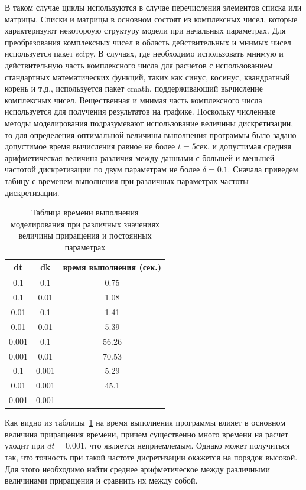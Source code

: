 В таком случае циклы используются в случае перечисления элементов списка или матрицы.
Списки и матрицы в основном состоят из комплексных чисел, которые характеризуют некотороую структуру
модели при начальных параметрах.
Для преобразования комплексных чисел в область действительных и мнимых чисел используется пакет scipy.
В случаях, где необходимо использовать мнимую и действительную часть комплексного числа для расчетов
с использованием стандартных математических функций, таких как синус, косинус, квандратный корень и т.д.,
используется пакет cmath, поддерживающий вычисление комплексных чисел.
Вещественная и мнимая часть комплексного числа используется для получения результатов на графике.
Поскольку численные методы моделирования подразумевают использование величины дискретизации, то для определения
оптимальной величины выполнения программы было задано допустимое время вычисления равное не более
$t = 5$сек. и допустимая средняя арифметическая величина различия между данными с большей и меньшей
частотой дискретизации по двум параметрам не более $\delta = 0.1$.
Сначала приведем табицу с временем выполнения при различных параметрах частоты дискретизации.
\newpage
\begin{table}[h!]
    \caption{Таблица времени выполнения моделирования при различных значениях величины приращения и постоянных параметрах}
    \label{tabular:table_runtime}
    \small
    \begin{tabular}{|c|c|c|}
        dt & dk & время выполнения (сек.) \\
        \hline
        0.1 & 0.1 & 0.75 \\
        0.1 & 0.01 & 1.08 \\
        0.01 & 0.1 & 1.41 \\
        0.01 & 0.01 & 5.39 \\
        0.001 & 0.1 & 56.26 \\
        0.001 & 0.01 & 70.53 \\
        0.1 & 0.001 & 5.29 \\
        0.01 & 0.001 & 45.1 \\
        0.001 & 0.001 & - \\
    \end{tabular}
\end{table}
Как видно из таблицы~\ref{tabular:table_runtime} на время выполнения программы влияет в основном величина
приращения времени, причем существенно много времени на расчет уходит при $dt = 0.001$, что является неприемлемым.
Однако может получиться так, что точность при такой частоте дисретизации окажется на порядок высокой.
Для этого необходимо найти среднее арифметическое между различными величинами приращения
и сравнить их между собой.

